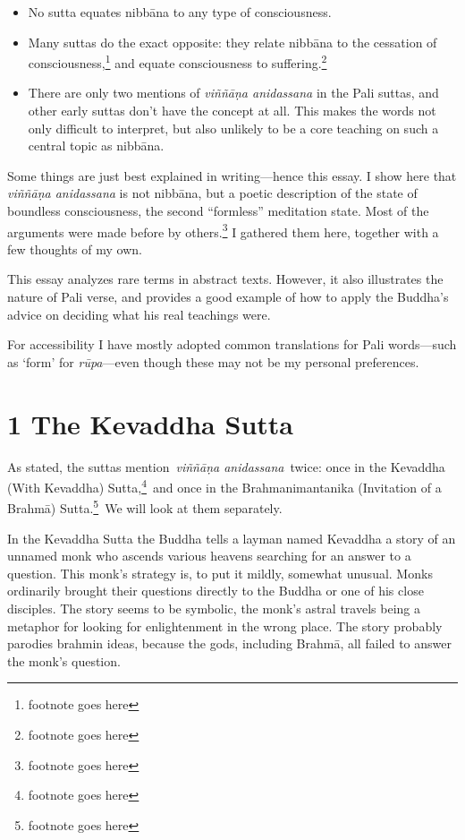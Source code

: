 \documentclass[10pt, openany]{book}
\begin{document}
\begin{itemize}

\itemsep5pt\parskip0pt


\item
No sutta equates nibbāna to any type of consciousness.



\item
Many suttas do the exact opposite: they relate nibbāna to the cessation of consciousness,\footnote{footnote goes here} and equate consciousness to suffering.\footnote{footnote goes here}



\item
There are only two mentions of \textit{viññāṇa anidassana} in the Pali suttas, and other early suttas don’t have the concept at all. This makes the words not only difficult to interpret, but also unlikely to be a core teaching on such a central topic as nibbāna.





\end{itemize}
Some things are just best explained in writing—hence this essay. I show here that \textit{viññāṇa anidassana} is not nibbāna, but a poetic description of the state of boundless consciousness, the second “formless” meditation state. Most of the arguments were made before by others.\footnote{footnote goes here} I gathered them here, together with a few thoughts of my own.


This essay analyzes rare terms in abstract texts. However, it also illustrates the nature of Pali verse, and provides a good example of how to apply the Buddha’s advice on deciding what his real teachings were.


For accessibility I have mostly adopted common translations for Pali words—such as ‘form’ for \textit{rūpa}—even though these may not be my personal preferences.


\chapter{ 1 The Kevaddha Sutta}
As stated, the suttas mention \textit{viññāṇa anidassana} twice: once in the Kevaddha (With Kevaddha) Sutta,\footnote{footnote goes here} and once in the Brahmanimantanika (Invitation of a Brahmā) Sutta.\footnote{footnote goes here} We will look at them separately.


In the Kevaddha Sutta the Buddha tells a layman named Kevaddha a story of an unnamed monk who ascends various heavens searching for an answer to a question. This monk’s strategy is, to put it mildly, somewhat unusual. Monks ordinarily brought their questions directly to the Buddha or one of his close disciples. The story seems to be symbolic, the monk’s astral travels being a metaphor for looking for enlightenment in the wrong place. The story probably parodies brahmin ideas, because the gods, including Brahmā, all failed to answer the monk’s question.
\end{document}
